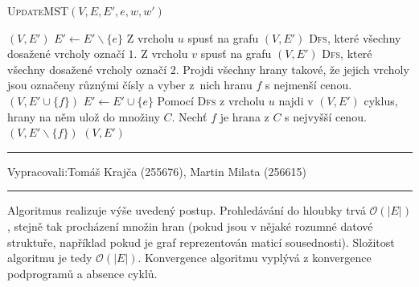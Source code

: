 \documentclass[12pt]{article}
\newcommand{\la}{\leftarrow}
\renewcommand{\O}{\mathcal{O}}
\newcommand{\zadani}[2]{
{\large
\noindent {\bf IB108 \hfill{} Sada #1, Příklad #2 \\[-4mm]}
\noindent\hrule
\vspace{2mm}
\noindent Vypracovali:\hfill{}Tomáš Krajča (255676), Martin Milata (256615)
\vspace{3mm}
\hrule
\bigskip\bigskip}
}
\begin{document}
\begin{algorithm}
\textsc{UpdateMST}$(V, E, E', e, w, w')$
\begin{algorithmic}[1]
	\RETURN $(V,E')$
	\STATE $E' \la E' \smallsetminus \{e\}$
	\STATE Z vrcholu $u$ spusť na grafu $(V,E')$ \textsc{Dfs}, které všechny dosažené vrcholy označí $1$.
	\STATE Z vrcholu $v$ spusť na grafu $(V,E')$ \textsc{Dfs}, které všechny dosažené vrcholy označí $2$.
	\STATE Projdi všechny hrany takové, že jejich vrcholy jsou označeny různými čísly a vyber z~nich hranu $f$ s nejmenší cenou.
	\RETURN $(V,E' \cup \{f\})$
	\STATE $E' \la E' \cup \{e\}$
	\STATE Pomocí \textsc{Dfs} z vrcholu $u$ najdi v $(V,E')$ cyklus, hrany na něm ulož do množiny $C$.
	\STATE Nechť $f$ je hrana z $C$ s nejvyšší cenou.
	\RETURN $(V,E' \smallsetminus \{f\})$
	\RETURN $(V,E')$
\ENDIF
\end{algorithmic}
\end{algorithm}

\clearpage
\zadani{3}{4}
\noindent
Algoritmus realizuje výše uvedený postup. Prohledávání do hloubky trvá $\O(|E|)$, stejně tak procházení množin hran
(pokud jsou v nějaké rozumné datové struktuře, například pokud je graf reprezentován maticí sousednosti). Složitost
algoritmu je tedy $\O(|E|)$. Konvergence algoritmu vyplývá z konvergence podprogramů a absence
cyklů.
\end{document}
